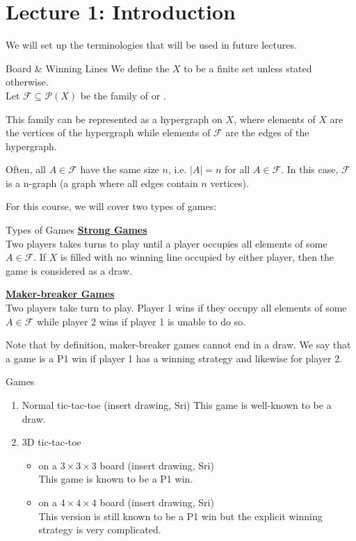 \documentclass[../main.tex]{subfiles}
\begin{document}
\section{Lecture 1: Introduction}
We will set up the terminologies that will be used in future lectures.

\begin{definition}[label=board_lines]{Board \& Winning Lines}
We define the  $X$ to be a finite set unless stated otherwise. \\
Let $\mathcal{F} \subseteq \mathcal{P}(X)$ be the family of  or .
\end{definition}

This family can be represented as a hypergraph on $X$, where elements of $X$ are the vertices of the hypergraph while elements of $\mathcal{F}$ are the edges of the hypergraph. 

Often, all \(A \in \mathcal{F}\) have the same size \(n\), i.e. $|A| = n$ for all \(A \in \mathcal{F}\). In this case, $\mathcal{F}$ is a n-graph (a graph where all edges contain \(n\) vertices).

For this course, we will cover two types of games:
\begin{definition}[label=game_types]{Types of Games}
    \underline{\textbf{Strong Games}} \\
    Two players takes turns to play until a player occupies all elements of some \(A \in \mathcal{F}\). If \(X\) is filled with no winning line occupied by either player, then the game is considered as a draw.
    
    \underline{\textbf{Maker-breaker Games}}\\
    Two players take turn to play. Player 1 wins if they occupy all elements of some \(A \in \mathcal{F}\) while player 2 wins if player 1 is unable to do so.
\end{definition}

Note that by definition, maker-breaker games cannot end in a draw. We say that a game is a P1 win if player 1 has a winning strategy and likewise for player 2.

\begin{example}[label=ex_game]{Games}
\begin{enumerate}
    \item Normal tic-tac-toe (insert drawing, Sri)
    This game is well-known to be a draw. 
    \item 3D tic-tac-toe 
    \begin{itemize}
        \item on a $3\times3\times3$ board (insert drawing, Sri)\\
        This game is known to be a P1 win.
        \item on a $4\times4\times4$ board (insert drawing, Sri)\\
        This version is still known to be a P1 win but the explicit winning strategy is very complicated.
    \end{itemize}
\end{enumerate}
\end{example}
\end{document}
